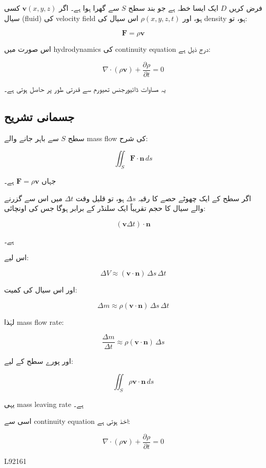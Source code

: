 \begin{enumerate}
فرض کریں \( D \) ایک ایسا خطہ ہے جو بند سطح \( S \) سے گھرا ہوا ہے۔ اگر \( \mathbf{v}(x,y,z) \) کسی سیال (fluid) کی velocity field ہو، اور \( \rho(x,y,z,t) \) اس سیال کی density ہو، تو:

\[
\mathbf{F} = \rho \mathbf{v}
\]

اس صورت میں hydrodynamics کی continuity equation درج ذیل ہے:

\[
\nabla \cdot (\rho \mathbf{v}) + \frac{\partial \rho}{\partial t} = 0
\]

\bigskip

یہ مساوات ڈائیورجنس تھیورم سے قدرتی طور پر حاصل ہوتی ہے۔

\bigskip

\subsection*{جسمانی تشریح}

سطح \( S \) سے باہر جانے والے mass flow کی شرح:

\[
\iint_S \mathbf{F}\cdot \mathbf{n}\, ds
\]

جہاں \( \mathbf{F} = \rho \mathbf{v} \) ہے۔

\bigskip

اگر سطح کے ایک چھوٹے حصے کا رقبہ \( \Delta s \) ہو، تو قلیل وقت \( \Delta t \) میں اس سے گزرنے والے سیال کا حجم تقریباً ایک سلنڈر کے برابر ہوگا جس کی اونچائی:

\[
(\mathbf{v}\Delta t)\cdot \mathbf{n}
\]

ہے۔

اس لیے:

\[
\Delta V \approx (\mathbf{v}\cdot \mathbf{n})\, \Delta s\, \Delta t
\]

اور اس سیال کی کمیت:

\[
\Delta m \approx \rho (\mathbf{v}\cdot \mathbf{n})\, \Delta s\, \Delta t
\]

لہٰذا mass flow rate:

\[
\frac{\Delta m}{\Delta t} \approx \rho (\mathbf{v}\cdot \mathbf{n})\, \Delta s
\]

اور پورے سطح کے لیے:

\[
\iint_S \rho \mathbf{v}\cdot \mathbf{n}\, ds
\]

یہی mass leaving rate ہے۔

\bigskip

اسی سے continuity equation اخذ ہوتی ہے:

\[
\nabla \cdot (\rho \mathbf{v}) + \frac{\partial \rho}{\partial t} = 0
\]

L92161


\end{enumerate}
